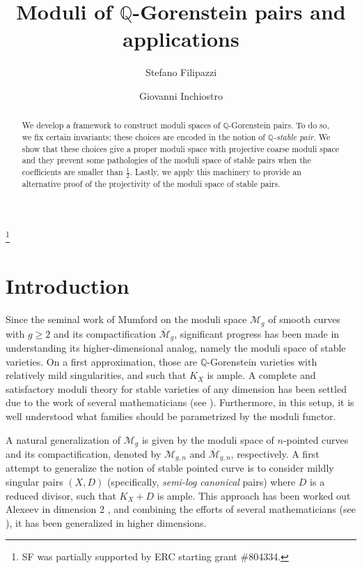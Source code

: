 \documentclass{amsart}
\newcommand{\bQ}{\mathbb{Q}}
\newcommand{\cM}{\mathcal{M}}
\theoremstyle{definition}
\renewcommand{\qq}{\mathbb{Q}}
\begin{document}
\title[Moduli of $\qq$-Gorenstein pairs and applications]{Moduli of $\qq$-Gorenstein pairs and applications}

\author[S.~Filipazzi]{Stefano Filipazzi}
\address{
EPFL, SB MATH CAG, MA C3 625 (B\^{a}timent MA), Station 8, CH-1015 Lausanne, Switzerland
}

\author[G.~Inchiostro]{Giovanni Inchiostro}
\address{
University of Washington, Department of Mathematics, Box 354350, Seattle, WA 98195 USA
}


\begin{abstract}
We develop a framework to construct moduli spaces of $\qq$-Gorenstein pairs.
To do so, we fix certain invariants; these choices are encoded in the notion of \emph{$\bQ$-stable pair}.
We show that these choices give a proper moduli space with projective coarse moduli space and they prevent some pathologies of the moduli space of stable pairs when the coefficients are smaller than $\frac{1}{2}$.
Lastly, we apply this machinery to provide an alternative proof of the projectivity of the moduli space of stable pairs.
\end{abstract}
\thanks{
SF was partially supported by ERC starting grant \#804334.
}

\maketitle

\section{Introduction}
Since the seminal work of Mumford on the moduli space $\cM_g$ of smooth curves with $g \geq 2$ and its compactification $\overline{\cM}_g$, significant progress has been made in understanding its higher-dimensional analog, namely the moduli space of stable varieties.
On a first approximation, those are $\mathbb{Q}$-Gorenstein varieties with relatively mild singularities, and such that $K_X$ is ample.
A complete and satisfactory moduli theory for stable varieties of any dimension has been settled due to the work of several mathematicians (see \cites{KSB, Kol90, Ale94, Vie95, Kol13-mod, Kol13, HK04, AH11, kol08, HX13, kol_new, HMX }).
Furthermore, in this setup, it is well understood what families should be parametrized by the moduli functor.

A natural generalization of $\cM_g$ is given by the moduli space of $n$-pointed curves and its compactification, denoted by $\cM_{g,n}$ and $\overline{\cM}_{g,n}$, respectively.
A first attempt to generalize the notion of stable pointed curve is to consider mildly singular pairs $(X,D)$ (specifically, \emph{semi-log canonical} pairs) where $D$ is a reduced divisor, such that $K_X+D$ is ample.
This approach has been worked out Alexeev in dimension 2 \cites{Ale94, Ale96}, and combining the efforts of several mathematicians (see \cites{ Ale94, Kol13, kol08, HX13, KP17, kol_new, HMX, kol19s }), it has been generalized in higher dimensions.
\end{document}
